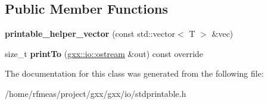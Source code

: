 \subsection*{Public Member Functions}
\begin{DoxyCompactItemize}
\item 
{\bfseries printable\+\_\+helper\+\_\+vector} (const std\+::vector$<$ T $>$ \&vec)\hypertarget{classgxx_1_1io_1_1printable__helper__vector_a27dc8e8bf204d5cc034e279f1bb880ca}{}\label{classgxx_1_1io_1_1printable__helper__vector_a27dc8e8bf204d5cc034e279f1bb880ca}

\item 
size\+\_\+t {\bfseries print\+To} (\hyperlink{classgxx_1_1io_1_1ostream}{gxx\+::io\+::ostream} \&out) const override\hypertarget{classgxx_1_1io_1_1printable__helper__vector_af6031a45f445bb49dba809071ea2fcf9}{}\label{classgxx_1_1io_1_1printable__helper__vector_af6031a45f445bb49dba809071ea2fcf9}

\end{DoxyCompactItemize}


The documentation for this class was generated from the following file\+:\begin{DoxyCompactItemize}
\item 
/home/rfmeas/project/gxx/gxx/io/stdprintable.\+h\end{DoxyCompactItemize}
